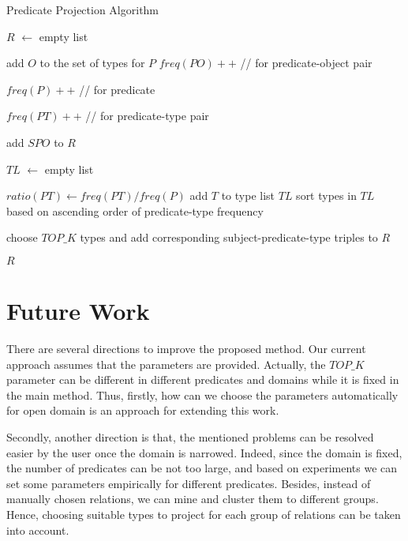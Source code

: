 \documentclass{acm_proc_article-sp}
\begin{document}
\begin{algorithm}
\label{algo1}
\caption{Predicate Projection Algorithm}

\SetAlgoLined
{}
$R$ $\leftarrow$ empty list

 {
	 {
		add $O$ to the set of types for $P$
	}
	$freq(PO)++$  //  for predicate-object pair

	$freq(P)++$  //  for predicate
}

 {
	 {
		$freq(PT)++$  //  for predicate-type pair
	}
}

 {
	 {
		add $SPO$ to $R$
	}
}
 {

	$TL$ $\leftarrow$ empty list

	 {
		$ratio(PT) \leftarrow freq(PT) / freq(P)$
		 {
			add $T$ to type list $TL$
		}
	}
	sort types in $TL$ based on ascending order of predicate-type frequency

	choose $TOP\_K$ types and add corresponding subject-predicate-type triples to $R$

}

\Return $R$

\end{algorithm}

\section{Future Work}

There are several directions to improve the proposed method. Our current approach assumes that the parameters are provided. Actually, the $TOP\_K$ parameter can be different in different predicates and domains while it is fixed in the main method. Thus, firstly, how can we choose the parameters automatically for open domain is an approach for extending this work.

Secondly, another direction is that, the mentioned problems can be resolved easier by the user once the domain is narrowed. Indeed, since the domain is fixed, the number of predicates can be not too large, and based on experiments we can set some parameters empirically for different predicates. Besides, instead of manually chosen relations, we can mine and cluster them to different groups. Hence, choosing suitable types to project for each group of relations can be taken into account.



\end{document}
